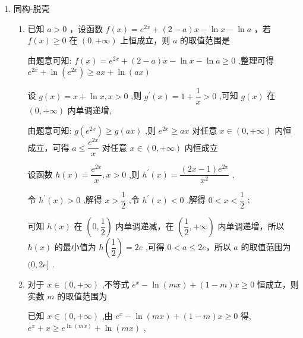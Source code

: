 \begin{enumerate}
    \item 同构-脱壳
    \begin{enumerate}
        \item 已知 $a > 0$ ，设函数 $f\left( x\right)  = {{e}}^{2x} + \left( {2 - a}\right) x - \ln x - \ln a$ ，若 $f\left( x\right)  \geq  0$ 在 $\left( {0, + \infty }\right)$ 上恒成立，则 $a$ 的取值范围是
        \begin{jieda}
            由题意可知: $f\left( x\right)  = {{e}}^{2x} + \left( {2 - a}\right) x - \ln x - \ln a \geq  0$ ,整理可得 ${{e}}^{2x} + \ln \left( {{e}}^{2x}\right)  \geq  {ax} + \ln \left( {ax}\right)$
            
            设 $g\left( x\right)  = x + \ln x,x > 0$ ,则 ${g}^{\prime }\left( x\right)  = 1 + \dfrac{1}{x} > 0$ ,可知 $g\left( x\right)$ 在 $\left( {0, + \infty }\right)$ 内单调递增,
            
            由题意可知: $g\left( {{e}}^{2x}\right)  \geq  g\left( {ax}\right)$ ,则 ${{e}}^{2x} \geq  {ax}$ 对任意 $x \in  \left( {0, + \infty }\right)$ 内恒成立，可得 $a \leq  \dfrac{{{e}}^{2x}}{x}$ 对任意 $x \in  \left( {0, + \infty }\right)$ 内恒成立
            
            设函数 $h\left( x\right)  = \dfrac{{{e}}^{2x}}{x},x > 0$ ,则 ${h}^{\prime }\left( x\right)  = \dfrac{\left( {{2x} - 1}\right) {{e}}^{2x}}{{x}^{2}}$ ,
            
            令 ${h}^{\prime }\left( x\right)  > 0$ ,解得 $x > \dfrac{1}{2}$ ,令 ${h}^{\prime }\left( x\right)  < 0$ ,解得 $0 < x < \dfrac{1}{2}$ ;
            
            可知 $h\left( x\right)$ 在 $\left( {0,\dfrac{1}{2}}\right)$ 内单调递减，在 $\left( {\dfrac{1}{2}, + \infty }\right)$ 内单调递增，所以 $h\left( x\right)$ 的最小值为 $h\left( \dfrac{1}{2}\right)  = 2{e}$ ,可得 $0 < a \leq  2{e}$，所以 $a$ 的取值范围为 $(0,2{e}\rbrack$ .
        \end{jieda}
        
        \item 对于 $x \in  \left( {0, + \infty }\right)$ ,不等式 ${{e}}^{x} - \ln \left( {mx}\right)  + \left( {1 - m}\right) x \geq  0$ 恒成立，则实数 $m$ 的取值范围为

        \begin{jieda}
            已知 $x \in  \left( {0, + \infty }\right)$ ,由 ${{e}}^{x} - \ln \left( {mx}\right)  + \left( {1 - m}\right) x \geq  0$ 得, ${{e}}^{x} + x \geq  {{e}}^{\ln \left( {mx}\right) } + \ln \left( {mx}\right)$ ,
            

\end{jieda}
\end{enumerate}
\end{enumerate}
